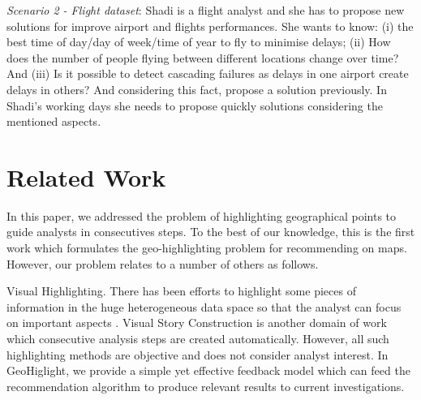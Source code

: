 \documentclass{sig-alternate-05-2015}
\begin{document}
\textit{Scenario 2 - Flight dataset}: Shadi is a flight analyst and she has to
propose new solutions for improve airport and flights performances. She wants to know:
(i) the best time of day/day of week/time of year to fly to minimise delays;
(ii) How does the number of people flying between different locations change
over time? And (iii) Is it possible to detect cascading failures as delays in
one airport create delays in others? And considering this fact, propose a
solution previously. In Shadi's working days she needs to propose quickly
solutions considering the mentioned aspects. 

% 
% 



\section{Related Work}\label{sec:related-works}

In this paper, we addressed the problem of highlighting geographical points to
guide analysts in consecutives steps. To the best of our knowledge, this is the
first work which formulates the geo-highlighting problem for recommending on
maps. However, our problem relates to a number of others as follows.     

Visual Highlighting. There has been efforts to highlight some pieces of
information in the huge heterogeneous data space so that the analyst can focus
on important aspects \cite{Liang2010,Lohmann:2012,Robinson2011}. Visual
Story Construction is another domain of work \cite{Segel:2010,Samet:2014} which
consecutive analysis steps are created automatically. However, all such highlighting methods are objective and does not consider analyst
interest. In GeoHiglight, we provide a simple yet effective feedback model which
can feed the recommendation algorithm to produce relevant results to current
investigations.        
\end{document}
